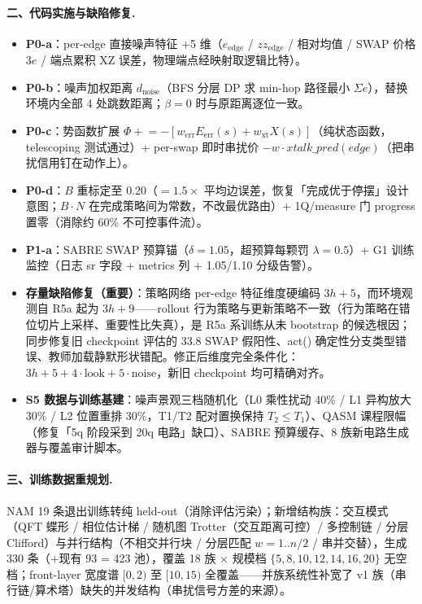 \paragraph{二、代码实施与缺陷修复.}
\begin{itemize}
    \item \textbf{P0-a}：per-edge 直接噪声特征 +5 维（$e_{\mathrm{edge}}$ / $zz_{\mathrm{edge}}$ / 相对均值 / SWAP 价格 $3e$ / 端点累积 XZ 误差，物理端点经映射取逻辑比特）。
    \item \textbf{P0-b}：噪声加权距离 $d_{\mathrm{noise}}$（BFS 分层 DP 求 min-hop 路径最小 $\Sigma e$），替换环境内全部 4 处跳数距离；$\beta=0$ 时与原距离逐位一致。
    \item \textbf{P0-c}：势函数扩展 $\Phi \mathrel{+}= -[w_{\mathrm{err}} E_{\mathrm{err}}(s) + w_{\mathrm{xt}} X(s)]$（纯状态函数，telescoping 测试通过）+ per-swap 即时串扰价 $-w\cdot xtalk\_pred(edge)$（把串扰信用钉在动作上）。
    \item \textbf{P0-d}：$B$ 重标定至 0.20（$=1.5\times$ 平均边误差，恢复「完成优于停摆」设计意图；$B\cdot N$ 在完成策略间为常数，不改最优路由）+ 1Q/measure 门 progress 置零（消除约 60\% 不可控事件流）。
    \item \textbf{P1-a}：SABRE SWAP 预算锚（$\delta=1.05$，超预算每颗罚 $\lambda=0.5$）+ G1 训练监控（日志 sr 字段 + metrics 列 + 1.05/1.10 分级告警）。
    \item \textbf{存量缺陷修复（重要）}：策略网络 per-edge 特征维度硬编码 $3h{+}5$，而环境观测自 R5a 起为 $3h{+}9$——rollout 行为策略与更新策略不一致（行为策略在错位切片上采样、重要性比失真），是 R5a 系训练从未 bootstrap 的候选根因；同步修复旧 checkpoint 评估的 33.8 SWAP 假阳性、act() 确定性分支类型错误、教师加载静默形状错配。修正后维度完全条件化：$3h+5+4\cdot\mathrm{look}+5\cdot\mathrm{noise}$，新旧 checkpoint 均可精确对齐。
    \item \textbf{S5 数据与训练基建}：噪声景观三档随机化（L0 乘性扰动 40\% / L1 异构放大 30\% / L2 位置重排 30\%，T1/T2 配对置换保持 $T_2\le T_1$）、QASM 课程限幅（修复「5q 阶段采到 20q 电路」缺口）、SABRE 预算缓存、8 族新电路生成器与覆盖审计脚本。
\end{itemize}

\paragraph{三、训练数据重规划.}
NAM 19 条退出训练转纯 held-out（消除评估污染）；新增结构族：交互模式（QFT 蝶形 / 相位估计梯 / 随机图 Trotter（交互距离可控）/ 多控制链 / 分层 Clifford）与并行结构（不相交并行块 / 分层匹配 $w{=}1..n/2$ / 串并交替），生成 330 条（+现有 93 = 423 池），覆盖 18 族 $\times$ 规模档 $\{5,8,10,12,14,16,20\}$ 无空档；front-layer 宽度谱 $[0,2)$ 至 $[10,15)$ 全覆盖——并族系统性补宽了 v1 族（串行链/算术塔）缺失的并发结构（串扰信号方差的来源）。

